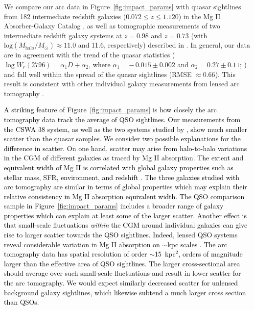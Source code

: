 \documentclass[twocolumn]{aastex62}
\newcommand{\MgII}{Mg\tiny{ }\footnotesize{II}\normalsize{ }}
\begin{document}
We compare our arc data in Figure~\ref{fig:impact_params} with quasar sightlines from 182 intermediate redshift galaxies ($0.072\leq z\leq 1.120$) in the \MgII Absorber-Galaxy Catalog \citep{Nielsen2013a}, as well as tomographic measurements of two intermediate redshift galaxy systems at $z=0.98$ and $z=0.73$ (with $\text{log}(M_{\text{halo}}/M_\odot)\approx11.0$ and 11.6, respectively) described in \cite{Lopez2018,Lopez2020}. In general, our data are in agreement with the trend of the quasar statistics ($\log W_{r}(2796) = \alpha_{1}D + \alpha_{2}$, where $\alpha_{1} = -\,0.015 \pm 0.002$ and $\alpha_{2} = 0.27 \pm 0.11$; \citealt{Nielsen2013a}) and fall well within the spread of the quasar sightlines (RMSE $\approx0.66$). This result is consistent with other individual galaxy measurements from lensed arc tomography \citep{Lopez2018,Lopez2020}. 

\textcolor{black}{A striking feature of Figure~\ref{fig:impact_params} is how closely the arc tomography data track the average of QSO sightlines. Our measurements from the CSWA 38 system, as well as the two systems studied by \cite{Lopez2018,Lopez2020}, show much smaller scatter than the quasar samples. We consider two possible explanations for the difference in scatter. On one hand, scatter may arise from halo-to-halo variations in the CGM of different galaxies as traced by \MgII absorption. The extent and equivalent width of \MgII is correlated with global galaxy properties such as stellar mass, SFR, environment, and redshift \citep[e.g.,][]{Bordoloi2011,Nielsen2013a}. The three galaxies studied with arc tomography are similar in terms of global properties which may explain their relative consistency in \MgII absorption equivalent width. The QSO comparison sample in Figure~\ref{fig:impact_params} includes a broader range of galaxy properties which can explain at least some of the larger scatter. 
Another effect is that small-scale fluctuations {\it within} the CGM around individual galaxies can give rise to larger scatter towards the QSO sightlines. Indeed, lensed QSO systems reveal considerable variation in \MgII absorption on $\sim$kpc scales \citep[e.g.,][]{Ellison2004,Chen2014,Rubin2018c}. The arc tomography data has spatial resolution of order $\sim$15~kpc${^2}$, orders of magnitude larger than the effective area of QSO sightlines. The larger cross-sectional area should average over such small-scale fluctuations and result in lower scatter for the arc tomography. We would expect similarly decreased scatter for unlensed background galaxy sightlines, which likewise subtend a much larger cross section than QSOs. 
}
\end{document}
